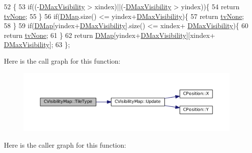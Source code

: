 \begin{DoxyCode}
52                                                               \{
53             \textcolor{keywordflow}{if}((-\hyperlink{classCVisibilityMap_ac8f71b9541c903fce0294d75daa1bbb1}{DMaxVisibility} > xindex)||(-\hyperlink{classCVisibilityMap_ac8f71b9541c903fce0294d75daa1bbb1}{DMaxVisibility} > yindex))\{
54                 \textcolor{keywordflow}{return} \hyperlink{classCVisibilityMap_a6665f905da08825adbb0eee7bd1f2f30aec106086bdc6328c8c6c02ee1bf32d2c}{tvNone};    
55             \}
56             \textcolor{keywordflow}{if}(\hyperlink{classCVisibilityMap_ad217bc34f7a50dd357a3eeeb69cfdd85}{DMap}.size() <= yindex+\hyperlink{classCVisibilityMap_ac8f71b9541c903fce0294d75daa1bbb1}{DMaxVisibility})\{
57                 \textcolor{keywordflow}{return} \hyperlink{classCVisibilityMap_a6665f905da08825adbb0eee7bd1f2f30aec106086bdc6328c8c6c02ee1bf32d2c}{tvNone};   
58             \}
59             \textcolor{keywordflow}{if}(\hyperlink{classCVisibilityMap_ad217bc34f7a50dd357a3eeeb69cfdd85}{DMap}[yindex+\hyperlink{classCVisibilityMap_ac8f71b9541c903fce0294d75daa1bbb1}{DMaxVisibility}].size() <= xindex+
      \hyperlink{classCVisibilityMap_ac8f71b9541c903fce0294d75daa1bbb1}{DMaxVisibility})\{
60                 \textcolor{keywordflow}{return} \hyperlink{classCVisibilityMap_a6665f905da08825adbb0eee7bd1f2f30aec106086bdc6328c8c6c02ee1bf32d2c}{tvNone};   
61             \}
62             \textcolor{keywordflow}{return} \hyperlink{classCVisibilityMap_ad217bc34f7a50dd357a3eeeb69cfdd85}{DMap}[yindex+\hyperlink{classCVisibilityMap_ac8f71b9541c903fce0294d75daa1bbb1}{DMaxVisibility}][xindex+
      \hyperlink{classCVisibilityMap_ac8f71b9541c903fce0294d75daa1bbb1}{DMaxVisibility}];
63         \};
\end{DoxyCode}
Here is the call graph for this function\+:\nopagebreak
\begin{figure}[H]
\begin{center}
\leavevmode
\includegraphics[width=350pt]{classCVisibilityMap_a8517fe52114dd469093fd1bd13482733_cgraph}
\end{center}
\end{figure}
Here is the caller graph for this function\+:\nopagebreak

